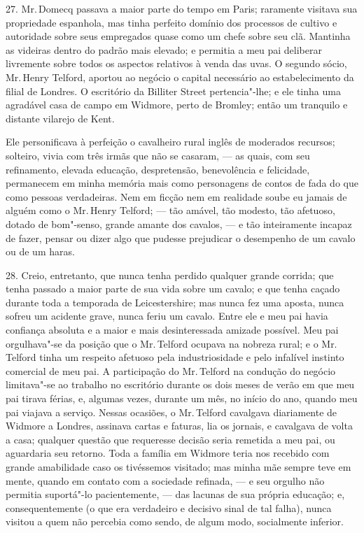27. Mr.\,Domecq passava a maior parte do tempo em Paris; raramente
visitava sua propriedade espanhola, mas tinha perfeito domínio dos
processos de cultivo e autoridade sobre seus empregados quase como um
chefe sobre seu clã. Mantinha as videiras dentro do padrão mais elevado;
e permitia a meu pai deliberar livremente sobre todos os aspectos
relativos à venda das uvas. O segundo sócio, Mr.\,Henry Telford, aportou
ao negócio o capital necessário ao estabelecimento da filial de Londres.
O escritório da Billiter Street pertencia"-lhe; e ele tinha uma agradável
casa de campo em Widmore, perto de Bromley; então um tranquilo e
distante vilarejo de Kent.

Ele personificava à perfeição o cavalheiro rural inglês de moderados
recursos; solteiro, vivia com três irmãs que não se casaram, --- as
quais, com seu refinamento, elevada educação, despretensão, benevolência
e felicidade, permanecem em minha memória mais como personagens de
contos de fada do que como pessoas verdadeiras. Nem em ficção nem em
realidade soube eu jamais de alguém como o Mr.\,Henry Telford; --- tão
amável, tão modesto, tão afetuoso, dotado de bom"-senso, grande amante
dos cavalos, --- e tão inteiramente incapaz de fazer, pensar ou dizer
algo que pudesse prejudicar o desempenho de um cavalo ou de um haras.

28. Creio, entretanto, que nunca tenha perdido qualquer grande corrida;
que tenha passado a maior parte de sua vida sobre um cavalo; e que tenha
caçado durante toda a temporada de Leicestershire; mas nunca fez uma
aposta, nunca sofreu um acidente grave, nunca feriu um cavalo. Entre ele
e meu pai havia confiança absoluta e a maior e mais desinteressada
amizade possível. Meu pai orgulhava"-se da posição que o Mr.\,Telford
ocupava na nobreza rural; e o Mr.\,Telford tinha um respeito afetuoso pela
industriosidade e pelo infalível instinto comercial de meu pai. A
participação do Mr.\,Telford na condução do negócio limitava"-se ao
trabalho no escritório durante os dois meses de verão em que meu pai
tirava férias, e, algumas vezes, durante um mês, no início do ano,
quando meu pai viajava a serviço. Nessas ocasiões, o Mr.\,Telford
cavalgava diariamente de Widmore a Londres, assinava cartas e faturas,
lia os jornais, e cavalgava de volta a casa; qualquer questão que
requeresse decisão seria remetida a meu pai, ou aguardaria seu retorno.
Toda a família em Widmore teria nos recebido com grande amabilidade caso
os tivéssemos visitado; mas minha mãe sempre teve em mente, quando em
contato com a sociedade refinada, --- e seu orgulho não permitia
suportá"-lo pacientemente, --- das lacunas de sua própria educação; e,
consequentemente (o que era verdadeiro e decisivo sinal de tal falha),
nunca visitou a quem não percebia como sendo, de algum modo, socialmente
inferior.

